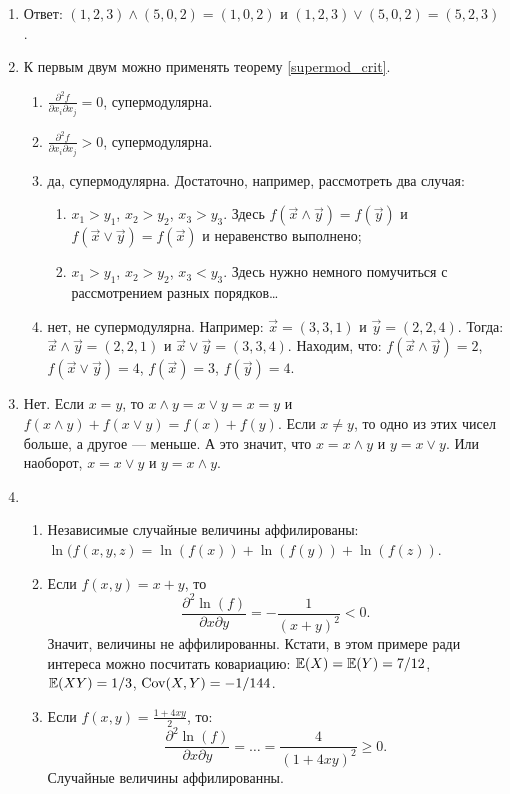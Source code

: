 \begin{enumerate}
\item Ответ: $ (1,2,3)\wedge (5,0,2)=(1,0,2) $ и $ (1,2,3)\vee (5,0,2)=(5,2,3) $.

\item К первым двум можно применять теорему \ref{supermod_crit}.
\begin{enumerate}
\item $ \frac{\partial^{2} f}{\partial x_{i}\partial x_{j}}=0 $, супермодулярна.
\item $ \frac{\partial^{2} f}{\partial x_{i}\partial x_{j}}>0 $, супермодулярна.
\item да, супермодулярна. Достаточно, например, рассмотреть два случая:
\begin{enumerate}
\item $ x_{1}>y_{1} $, $ x_{2}>y_{2} $, $x_{3}>y_{3}$. Здесь $ f(\vec{x}\wedge \vec{y})=f(\vec{y}) $ и $ f(\vec{x}\vee \vec{y})=f(\vec{x}) $ и неравенство выполнено;
\item $ x_{1}>y_{1} $, $ x_{2}>y_{2} $, $x_{3}<y_{3}$. Здесь нужно немного помучиться с рассмотрением разных порядков\ldots
\end{enumerate}
\item нет, не супермодулярна. Например: $ \vec{x}=(3,3,1) $ и $ \vec{y}=(2,2,4) $. Тогда: $ \vec{x}\wedge \vec{y}=(2,2,1) $ и $ \vec{x}\vee\vec{y}=(3,3,4) $. Находим, что: $ f(\vec{x}\wedge \vec{y})=2 $, $ f(\vec{x}\vee \vec{y})=4 $, $ f(\vec{x})=3 $, $ f(\vec{y})=4 $.

\end{enumerate}

\item Нет. Если $ x=y $, то $ x\wedge y=x\vee y=x=y $  и $ f(x\wedge y)+f(x\vee y)= f(x)+f(y) $. Если $ x\neq y $, то одно из этих чисел больше, а другое — меньше. А это значит, что $ x=x\wedge y $ и $ y=x \vee y $. Или наоборот, $ x=x\vee y $ и $ y=x\wedge y $.

\item {}
\begin{enumerate}
\item Независимые случайные величины аффилированы:
$\ln(f(x,y,z)=\ln(f(x))+\ln(f(y))+\ln(f(z)) $.
\item Если $ f(x,y)=x+y $, то
\begin{equation}
\frac{\partial^{2} \ln(f)}{\partial x \partial y}=-\frac{1}{(x+y)^{2}}<0.
\end{equation}
Значит, величины не аффилированны. Кстати, в этом примере ради интереса можно посчитать ковариацию: $ \operatorname{\mathbb{E}}(X)=\operatorname{\mathbb{E}}(Y)=7/12 $, $ \operatorname{\mathbb{E}}(XY)=1/3 $, $ \operatorname{Cov}(X,Y)=-1/144 $.
\item Если  $ f(x,y)=\frac{1+4xy}{2} $, то:
\begin{equation}
\frac{\partial^{2} \ln(f)}{\partial x \partial y}=\ldots=\frac{4}{(1+4xy)^{2}}\geq 0.
\end{equation}
Случайные величины аффилированны.


\end{enumerate}
\end{enumerate}
